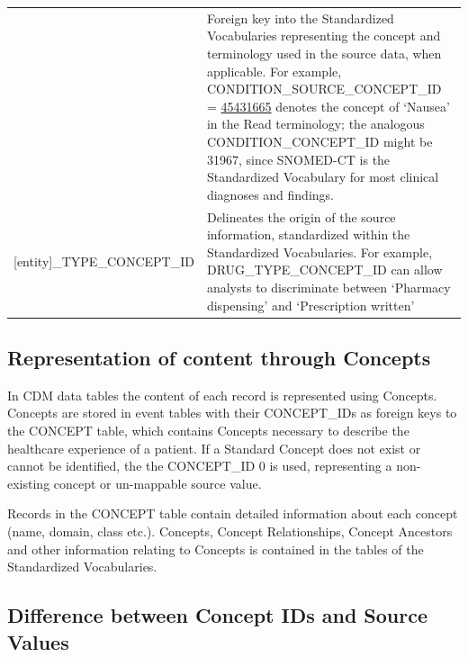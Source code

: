 \documentclass[11pt]{book}
\begin{document}
\begin{longtable}[]{@{}ll@{}}
\begin{minipage}[t]{0.34\columnwidth}
\end{minipage} & \begin{minipage}[t]{0.61\columnwidth}\raggedright\strut
Foreign key into the Standardized Vocabularies representing the concept
and terminology used in the source data, when applicable. For example,
CONDITION\_SOURCE\_CONCEPT\_ID =
\href{http://athena.ohdsi.org/search-terms/terms/45431665}{45431665}
denotes the concept of `Nausea' in the Read terminology; the analogous
CONDITION\_CONCEPT\_ID might be 31967, since SNOMED-CT is the
Standardized Vocabulary for most clinical diagnoses and findings.\strut
\end{minipage}\tabularnewline
\begin{minipage}[t]{0.34\columnwidth}\raggedright\strut
{[}entity{]}\_TYPE\_CONCEPT\_ID\strut
\end{minipage} & \begin{minipage}[t]{0.61\columnwidth}\raggedright\strut
Delineates the origin of the source information, standardized within the
Standardized Vocabularies. For example, DRUG\_TYPE\_CONCEPT\_ID can
allow analysts to discriminate between `Pharmacy dispensing' and
`Prescription written'\strut
\end{minipage}\tabularnewline
\bottomrule
\end{longtable}

\subsection{Representation of content through
Concepts}\label{representation-of-content-through-concepts}

In CDM data tables the content of each record is represented using
Concepts. Concepts are stored in event tables with their CONCEPT\_IDs as
foreign keys to the CONCEPT table, which contains Concepts necessary to
describe the healthcare experience of a patient. If a Standard Concept
does not exist or cannot be identified, the the CONCEPT\_ID 0 is used,
representing a non-existing concept or un-mappable source value.

Records in the CONCEPT table contain detailed information about each
concept (name, domain, class etc.). Concepts, Concept Relationships,
Concept Ancestors and other information relating to Concepts is
contained in the tables of the Standardized Vocabularies.

\subsection{Difference between Concept IDs and Source
Values}\label{difference-between-concept-ids-and-source-values}
\end{document}
